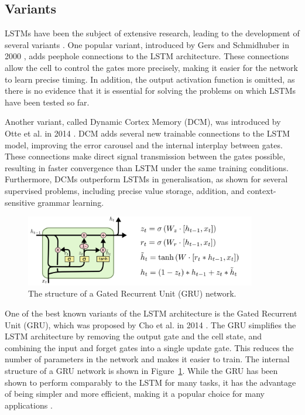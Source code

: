 \documentclass{article}
\newcommand{\reffig}[1]{Figure~\ref{#1}}
\begin{document}
\subsection{Variants}
\label{sec:3.1}

LSTMs have been the subject of extensive research, leading to the development of several
variants \cite{greffLSTMSearchSpace2017}. One popular variant, introduced by Gers and
Schmidhuber in 2000 \cite{gersRecurrentNetsTime2000}, adds peephole connections to the
LSTM architecture. These connections allow the cell to control the gates more precisely,
making it easier for the network to learn precise timing. In addition, the output
activation function is omitted, as there is no evidence that it is essential for solving
the problems on which LSTMs have been tested so far.

Another variant, called Dynamic Cortex Memory (DCM), was introduced by Otte et al. in 2014
\cite{otte2014dynamic}. DCM adds several new trainable connections to the LSTM model,
improving the error carousel and the internal interplay between gates. These connections
make direct signal transmission between the gates possible, resulting in faster
convergence than LSTM under the same training conditions. Furthermore, DCMs outperform
LSTMs in generalisation, as shown for several supervised problems, including precise value
storage, addition, and context-sensitive grammar learning.


\begin{figure}[htbp]
  \centering
  \includegraphics[width=0.9\textwidth]{LSTM3-var-GRU.png}
  \caption{The structure of a Gated Recurrent Unit (GRU) network. \cite{olahUnderstandingLSTM}}
  \label{fig:gru}
\end{figure}
One of the best known variants of the LSTM architecture is the Gated Recurrent Unit (GRU),
which was proposed by Cho et al. in 2014 \cite{choLearningPhraseRepresentations2014}. The
GRU simplifies the LSTM architecture by removing the output gate and the cell state, and
combining the input and forget gates into a single update gate. This reduces the number of
parameters in the network and makes it easier to train. The internal structure of a GRU
network is shown in \reffig{fig:gru}. While the GRU has been shown to perform comparably
to the LSTM for many tasks, it has the advantage of being simpler and more efficient,
making it a popular choice for many applications \cite{Yang2020}.
\end{document}
